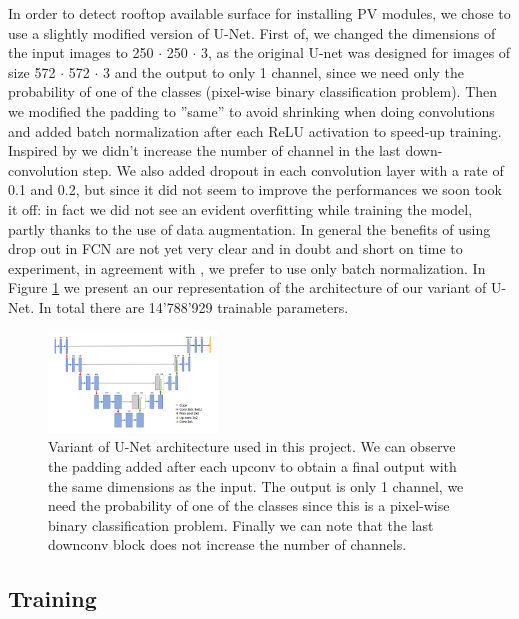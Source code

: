 \documentclass[9pt,conference,compsocconf]{IEEEtran}
\begin{document}
In order to detect rooftop available surface for installing PV modules, we chose to use a slightly modified version of U-Net. First of, we changed the dimensions of the input images to 250 $\cdot$ 250 $\cdot$ 3, as the original U-net was designed for images of size 572 $\cdot$ 572 $\cdot$ 3 and the output to only 1 channel, since we need only the probability of one of the classes (pixel-wise binary classification problem).
Then we modified the padding to ”same” to avoid shrinking when doing convolutions and added batch normalization after each ReLU activation to speed-up training. Inspired by \cite{VariantUNet} we didn't increase the number of channel in the last down-convolution step. We also added dropout in each convolution layer with a rate of 0.1 and 0.2, but since it did not seem to improve the performances we soon took it off: in fact we did not see an evident overfitting while training the model, partly thanks to the use of data augmentation. In general the benefits of using drop out in FCN are not yet very clear and in doubt and short on time to experiment, in agreement with \cite{garbin2020dropout}, we prefer to use only batch normalization. In Figure \ref{fig:u_netbis} we present an our representation of the architecture of our variant of U-Net. In total there are 14'788'929 trainable parameters. 
\begin{figure}[h]
    \centering
    \includegraphics[width=0.4\textwidth]{figures/arch.png}
    \caption{\footnotesize{Variant of U-Net architecture used in this project. We can observe the padding added after each upconv to obtain a final output with the same dimensions as the input. The output is only 1 channel, we need the probability of one of the classes since this is a pixel-wise binary classification problem. Finally we can note that the last downconv block does not increase the number of channels.}}
    \label{fig:u_netbis}
\end{figure}


\subsection{Training}
\label{subsec:training}
\end{document}
